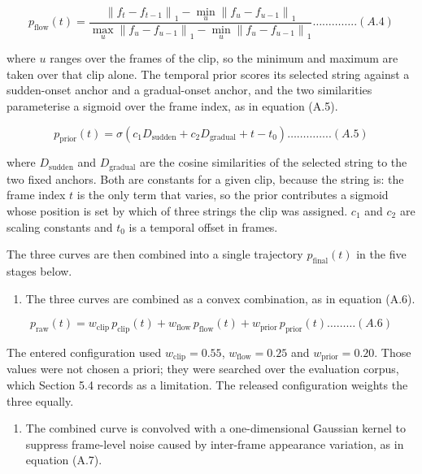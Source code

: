 \[p_{\text{flow}}(t) = \frac{\left\| f_{t} - f_{t-1} \right\|_{1} - \min_{u}\left\| f_{u} - f_{u-1} \right\|_{1}}{\max_{u}\left\| f_{u} - f_{u-1} \right\|_{1} - \min_{u}\left\| f_{u} - f_{u-1} \right\|_{1}}\ldots\ldots\ldots\ldots..(A.4)\]

where \(u\) ranges over the frames of the clip, so the minimum and maximum are taken over that clip alone. The temporal prior scores its selected string against a sudden-onset anchor and a gradual-onset anchor, and the two similarities parameterise a sigmoid over the frame index, as in equation (A.5).

\[p_{\text{prior}}(t) = \sigma\left( c_{1}D_{\text{sudden}} + c_{2}D_{\text{gradual}} + t - t_{0} \right)\ldots\ldots\ldots\ldots..(A.5)\]

where \(D_{\text{sudden}}\) and \(D_{\text{gradual}}\) are the cosine similarities of the selected string to the two fixed anchors. Both are constants for a given clip, because the string is: the frame index \(t\) is the only term that varies, so the prior contributes a sigmoid whose position is set by which of three strings the clip was assigned. \(c_{1}\) and \(c_{2}\) are scaling constants and \(t_{0}\) is a temporal offset in frames.

The three curves are then combined into a single trajectory \(p_{\text{final}}(t)\) in the five stages below.

\begin{enumerate}
\def\labelenumi{\arabic{enumi}.}
\item
  The three curves are combined as a convex combination, as in equation (A.6).
\end{enumerate}

\[p_{\text{raw}}(t) = w_{\text{clip}}\,p_{\text{clip}}(t) + w_{\text{flow}}\,p_{\text{flow}}(t) + w_{\text{prior}}\,p_{\text{prior}}(t)\ldots\ldots\ldots(A.6)\]

The entered configuration used \(w_{\text{clip}} = 0.55\), \(w_{\text{flow}} = 0.25\) and \(w_{\text{prior}} = 0.20\). Those values were not chosen a priori; they were searched over the evaluation corpus, which Section 5.4 records as a limitation. The released configuration weights the three equally.

\begin{enumerate}
\def\labelenumi{\arabic{enumi}.}
\setcounter{enumi}{1}
\item
  The combined curve is convolved with a one-dimensional Gaussian kernel to suppress frame-level noise caused by inter-frame appearance variation, as in equation (A.7).
\end{enumerate}

